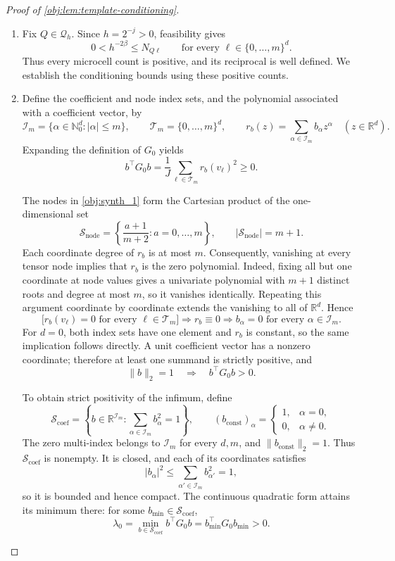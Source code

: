 \documentclass[11pt]{article}
\begin{document}
\begin{proof}[Proof of \cref{obj:lem:template-conditioning}]
\begin{enumerate}
\item Fix \(Q\in\mathcal Q_h\). Since \(h=2^{-j}>0\), feasibility gives
\[
0<h^{-2\beta}\le N_{Q\ell}
\qquad\text{for every }\ell\in\{0,\ldots,m\}^d.
\]
Thus every microcell count is positive, and its reciprocal is well defined. We establish the conditioning bounds using these positive counts.

\item Define the coefficient and node index sets, and the polynomial associated with a coefficient vector, by
\[
\mathcal I_m=\{\alpha\in\mathbb N_0^d:|\alpha|\le m\},
\qquad
\mathcal T_m=\{0,\ldots,m\}^d,
\qquad
r_b(z)=\sum_{\alpha\in\mathcal I_m}b_\alpha z^\alpha
\quad(z\in\mathbb R^d).
\]
Expanding the definition of \(G_0\) yields
\[
b^\top G_0b=\frac1J\sum_{\ell\in\mathcal T_m}r_b(v_\ell)^2\ge0.
\]

The nodes in \cref{obj:synth_1} form the Cartesian product of the one-dimensional set
\[
\mathcal S_{\mathrm{node}}
=\left\{\frac{a+1}{m+2}:a=0,\ldots,m\right\},
\qquad
|\mathcal S_{\mathrm{node}}|=m+1.
\]
Each coordinate degree of \(r_b\) is at most \(m\). Consequently, vanishing at every tensor node implies that \(r_b\) is the zero polynomial. Indeed, fixing all but one coordinate at node values gives a univariate polynomial with \(m+1\) distinct roots and degree at most \(m\), so it vanishes identically. Repeating this argument coordinate by coordinate extends the vanishing to all of \(\mathbb R^d\). Hence
\[
\bigl[r_b(v_\ell)=0\text{ for every }\ell\in\mathcal T_m\bigr]
\Longrightarrow r_b\equiv0
\Longrightarrow b_\alpha=0\text{ for every }\alpha\in\mathcal I_m.
\]
For \(d=0\), both index sets have one element and \(r_b\) is constant, so the same implication follows directly. A unit coefficient vector has a nonzero coordinate; therefore at least one summand is strictly positive, and
\[
\|b\|_2=1\quad\Longrightarrow\quad b^\top G_0b>0.
\]

To obtain strict positivity of the infimum, define
\[
\mathcal S_{\mathrm{coef}}
=\left\{b\in\mathbb R^{\mathcal I_m}:
\sum_{\alpha\in\mathcal I_m}b_\alpha^2=1\right\},
\qquad
(b_{\mathrm{const}})_\alpha=
\begin{cases}
1,&\alpha=0,\\
0,&\alpha\ne0.
\end{cases}
\]
The zero multi-index belongs to \(\mathcal I_m\) for every \(d,m\), and
\(\|b_{\mathrm{const}}\|_2=1\). Thus \(\mathcal S_{\mathrm{coef}}\) is nonempty.
It is closed, and each of its coordinates satisfies
\[
|b_\alpha|^2\le\sum_{\alpha'\in\mathcal I_m}b_{\alpha'}^2=1,
\]
so it is bounded and hence compact. The continuous quadratic form attains its minimum there: for some \(b_{\min}\in\mathcal S_{\mathrm{coef}}\),
\[
\lambda_0
=\min_{b\in\mathcal S_{\mathrm{coef}}}b^\top G_0b
=b_{\min}^\top G_0b_{\min}>0.
\]


\end{enumerate}
\end{proof}
\end{document}
